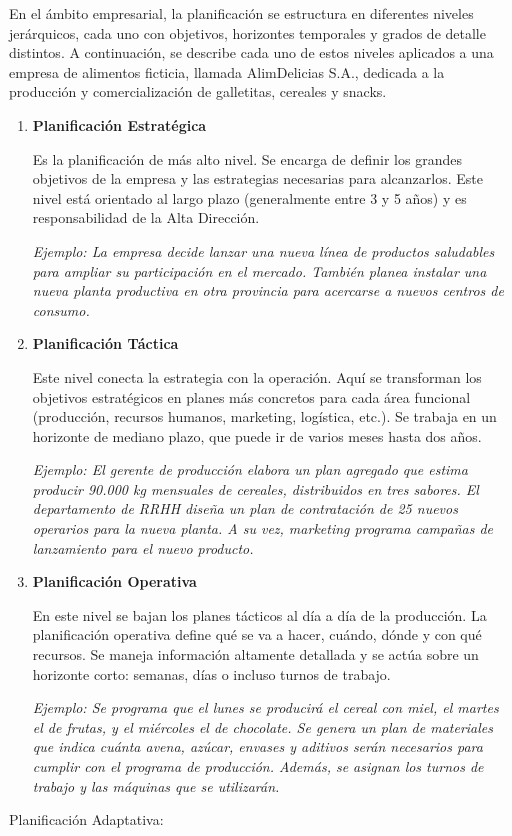 \documentclass[a4paper,oneside,11pt]{article}
\begin{document}
En el ámbito empresarial, la planificación se estructura en diferentes niveles jerárquicos, cada uno con objetivos, horizontes temporales y grados de detalle distintos. A continuación, se describe cada uno de estos niveles aplicados a una empresa de alimentos ficticia, llamada AlimDelicias S.A., dedicada a la producción y comercialización de galletitas, cereales y snacks.

\begin{enumerate}
    \item \textbf{Planificación Estratégica}

    Es la planificación de más alto nivel. Se encarga de definir los grandes objetivos de la empresa y las estrategias necesarias para alcanzarlos. Este nivel está orientado al largo plazo (generalmente entre 3 y 5 años) y es responsabilidad de la Alta Dirección.

    \textit{Ejemplo: La empresa decide lanzar una nueva línea de productos saludables para ampliar su participación en el mercado. También planea instalar una nueva planta productiva en otra provincia para acercarse a nuevos centros de consumo.}

    \item \textbf{Planificación Táctica}

    Este nivel conecta la estrategia con la operación. Aquí se transforman los objetivos estratégicos en planes más concretos para cada área funcional (producción, recursos humanos, marketing, logística, etc.). Se trabaja en un horizonte de mediano plazo, que puede ir de varios meses hasta dos años.

    \textit{Ejemplo: El gerente de producción elabora un plan agregado que estima producir 90.000 kg mensuales de cereales, distribuidos en tres sabores. El departamento de RRHH diseña un plan de contratación de 25 nuevos operarios para la nueva planta. A su vez, marketing programa campañas de lanzamiento para el nuevo producto.}

    \item \textbf{Planificación Operativa}

    En este nivel se bajan los planes tácticos al día a día de la producción. La planificación operativa define qué se va a hacer, cuándo, dónde y con qué recursos. Se maneja información altamente detallada y se actúa sobre un horizonte corto: semanas, días o incluso turnos de trabajo.

    \textit{Ejemplo: Se programa que el lunes se producirá el cereal con miel, el martes el de frutas, y el miércoles el de chocolate. Se genera un plan de materiales que indica cuánta avena, azúcar, envases y aditivos serán necesarios para cumplir con el programa de producción. Además, se asignan los turnos de trabajo y las máquinas que se utilizarán.}

\end{enumerate}
Planificación Adaptativa:
\end{document}
